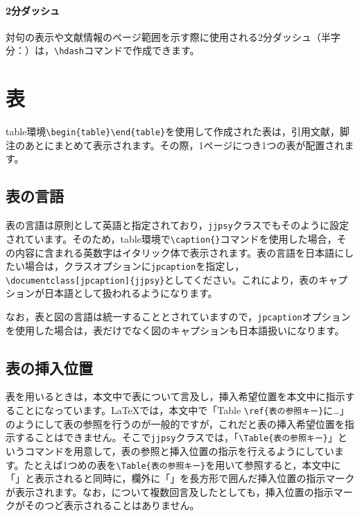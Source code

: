 \documentclass{jjpsy}
\begin{document}
\paragraph{2分ダッシュ}
対句の表示や文献情報のページ範囲を示す際に使用される2分ダッシュ（半字分：\hdash）は，\texttt{\textbackslash{}hdash}コマンドで作成できます。

\section{表}

table環境\texttt{\textbackslash{}begin\{table\}}\dash\texttt{\textbackslash{}end\{table\}}を使用して作成された表は，引用文献，脚注のあとにまとめて表示されます。その際，1ページにつき1つの表が配置されます。

\subsection{表の言語}

表の言語は原則として英語と指定されており，\texttt{jjpsy}クラスでもそのように設定されています。そのため，table環境で\texttt{\textbackslash{}caption\{\}}コマンドを使用した場合，その内容に含まれる英数字はイタリック体で表示されます。表の言語を日本語にしたい場合は，クラスオプションに\texttt{jpcaption}を指定し，\texttt{\textbackslash{}documentclass[jpcaption]\{jjpsy\}}としてください。これにより，表のキャプションが日本語として扱われるようになります。

なお，表と図の言語は統一することとされていますので，\texttt{jpcaption}オプションを使用した場合は，表だけでなく図のキャプションも日本語扱いになります。

\subsection{表の挿入位置}

表を用いるときは，本文中で表について言及し，挿入希望位置を本文中に指示することになっています。\LaTeX{}では，本文中で「Table \texttt{\textbackslash{}ref\{表の参照キー\}}に\dots」のようにして表の参照を行うのが一般的ですが，これだと表の挿入希望位置を指示することはできません。そこで\texttt{jjpsy}クラスでは，「\texttt{\textbackslash{}Table\{表の参照キー\}}」というコマンドを用意して，表の参照と挿入位置の指示を行えるようにしています。たとえば1つめの表を\texttt{\textbackslash{}Table\{表の参照キー\}}を用いて参照すると，本文中に「」と表示されると同時に，欄外に「」を長方形で囲んだ挿入位置の指示マークが表示されます。なお，について複数回言及したとしても，挿入位置の指示マークがそのつど表示されることはありません。
\end{document}
